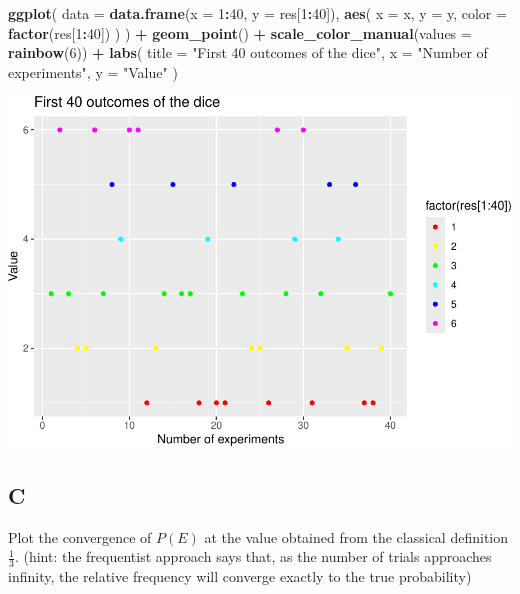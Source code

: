 \documentclass[
]{article}
\newenvironment{Shaded}{\begin{snugshade}}{\end{snugshade}}
\newcommand{\AttributeTok}[1]{\textcolor[rgb]{0.13,0.29,0.53}{#1}}
\newcommand{\DecValTok}[1]{\textcolor[rgb]{0.00,0.00,0.81}{#1}}
\newcommand{\FunctionTok}[1]{\textcolor[rgb]{0.13,0.29,0.53}{\textbf{#1}}}
\newcommand{\NormalTok}[1]{#1}
\newcommand{\SpecialCharTok}[1]{\textcolor[rgb]{0.81,0.36,0.00}{\textbf{#1}}}
\newcommand{\StringTok}[1]{\textcolor[rgb]{0.31,0.60,0.02}{#1}}
\begin{document}
\begin{Shaded}
\begin{Highlighting}[]
\FunctionTok{ggplot}\NormalTok{(}
  \AttributeTok{data =} \FunctionTok{data.frame}\NormalTok{(}\AttributeTok{x =} \DecValTok{1}\SpecialCharTok{:}\DecValTok{40}\NormalTok{, }\AttributeTok{y =}\NormalTok{ res[}\DecValTok{1}\SpecialCharTok{:}\DecValTok{40}\NormalTok{]),}
  \FunctionTok{aes}\NormalTok{(}
    \AttributeTok{x =}\NormalTok{ x,}
    \AttributeTok{y =}\NormalTok{ y,}
    \AttributeTok{color =} \FunctionTok{factor}\NormalTok{(res[}\DecValTok{1}\SpecialCharTok{:}\DecValTok{40}\NormalTok{])}
\NormalTok{  )}
\NormalTok{) }\SpecialCharTok{+}
  \FunctionTok{geom\_point}\NormalTok{() }\SpecialCharTok{+}
  \FunctionTok{scale\_color\_manual}\NormalTok{(}\AttributeTok{values =} \FunctionTok{rainbow}\NormalTok{(}\DecValTok{6}\NormalTok{)) }\SpecialCharTok{+}
  \FunctionTok{labs}\NormalTok{(}
    \AttributeTok{title =} \StringTok{"First 40 outcomes of the dice"}\NormalTok{,}
    \AttributeTok{x =} \StringTok{"Number of experiments"}\NormalTok{, }\AttributeTok{y =} \StringTok{"Value"}
\NormalTok{  )}
\end{Highlighting}
\end{Shaded}

\includegraphics{es_files/figure-latex/unnamed-chunk-5-1.pdf}

\hypertarget{c-1}{%
\subsection{C}\label{c-1}}

Plot the convergence of \(P(E)\) at the value obtained from the
classical definition \(\frac{1}{3}\). (hint: the frequentist approach
says that, as the number of trials approaches infinity, the relative
frequency will converge exactly to the true probability)
\end{document}
